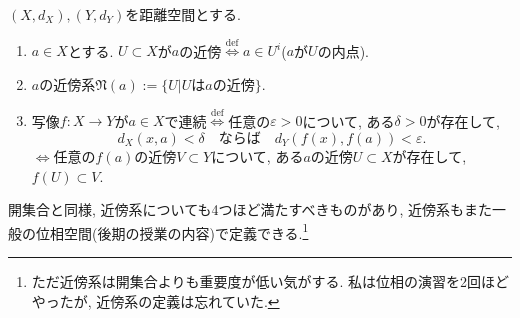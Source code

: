 \documentclass[dvipdfmx,a4paper,11pt]{article}
\theoremstyle{definition}
\newtheorem{thm}{定理}
\begin{document}
\begin{tcolorbox}[
    colback = white,
    colframe = black!35!black,
    fonttitle = \bfseries,
    breakable = true]
    $(X, d_X), (Y, d_Y)$を距離空間とする. 
    \begin{enumerate}
    \setlength{\parskip}{0cm} 
  \setlength{\itemsep}{0cm} 
\item  $a \in X$とする. $U \subset X$が$a$の近傍$\stackrel{\mathrm{def}}{\Longleftrightarrow}$$a \in U^i$($a$が$U$の内点).
\item $a$の近傍系$\mathfrak{N}(a):= \{ U | \text{$U$は$a$の近傍}\}$.
\item 写像$f :X \to Y$が$a \in X$で連続$\stackrel{\mathrm{def}}{\Longleftrightarrow}$任意の$\varepsilon >0$について, ある$\delta>0$が存在して,
$$
d_X(x, a) < \delta
\quad
\text{ならば}
\quad
d_Y(f(x), f(a)) < \varepsilon.
$$
$\stackrel{}{\Longleftrightarrow}$任意の$f(a)$の近傍$V \subset Y$について, ある$a$の近傍$U \subset X$が存在して, $f(U) \subset V$.
\end{enumerate}
 \end{tcolorbox}
 開集合と同様, 近傍系についても4つほど満たすべきものがあり, 近傍系もまた一般の位相空間(後期の授業の内容)で定義できる.\footnote{ただ近傍系は開集合よりも重要度が低い気がする. 私は位相の演習を2回ほどやったが, 近傍系の定義は忘れていた. }

 \begin{comment}


 \begin{tcolorbox}[
    colback = white,
    colframe = black!35!black,
    fonttitle = \bfseries,
    breakable = true]
    \begin{thm}
 $(X, d)$を距離空間, $a \in X$とする. $a$の近傍系$\mathfrak{N}(a)$について以下が成り立つ. 
\begin{enumerate}[label=(\arabic*).]
    \setlength{\parskip}{0cm} 
  \setlength{\itemsep}{0cm} 
    \item $X \in \mathfrak{N}(a)$. $U \in \mathfrak{N}(a)$ならば$a \in U$.
    \item $U_1, U_2 \in \mathfrak{N}(a)$ならば$U_1 \cap U_2 \in \mathfrak{N}(a)$.
    \item $U \in \mathfrak{N}(a)$かつ$U \subset V \subset X$ならば$V \in \mathfrak{N}(a)$.
    \item 任意の$U \in \mathfrak{N}(a)$について, ある$V \in \mathfrak{N}(a)$があって, $b \in V$ならば$U \in \mathfrak{N}(b)$となる． 
    \end{enumerate}
        \end{thm}
 \end{tcolorbox}
  \end{comment}
\end{document}
